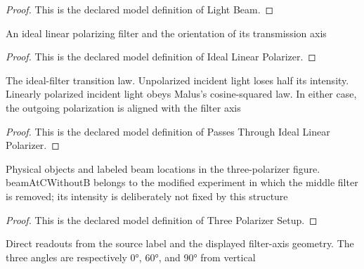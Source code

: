\begin{proof}
  This is the declared model definition of Light Beam.
\end{proof}
\begin{definition}
  \label{def:physics:phyx-mini-0093:phyxminiproblems-problemphyxmini0093-ideallinearpolarizer}
  An ideal linear polarizing filter and the orientation of its transmission axis
\end{definition}
\begin{proof}
  This is the declared model definition of Ideal Linear Polarizer.
\end{proof}
\begin{definition}
  \label{def:physics:phyx-mini-0093:phyxminiproblems-problemphyxmini0093-passesthroughideallinearpolarizer}
  The ideal-filter transition law. Unpolarized incident light loses half its intensity. Linearly polarized incident light obeys Malus's cosine-squared law. In either case, the outgoing polarization is aligned with the filter axis
\end{definition}
\begin{proof}
  This is the declared model definition of Passes Through Ideal Linear Polarizer.
\end{proof}
\begin{definition}
  \label{def:physics:phyx-mini-0093:phyxminiproblems-problemphyxmini0093-threepolarizersetup}
  Physical objects and labeled beam locations in the three-polarizer figure. beamAtCWithoutB belongs to the modified experiment in which the middle filter is removed; its intensity is deliberately not fixed by this structure
\end{definition}
\begin{proof}
  This is the declared model definition of Three Polarizer Setup.
\end{proof}
\begin{definition}
  \label{def:physics:phyx-mini-0093:phyxminiproblems-problemphyxmini0093-threepolarizerfigurereadouts}
  Direct readouts from the source label and the displayed filter-axis geometry. The three angles are respectively 0°, 60°, and 90° from vertical
\end{definition}

